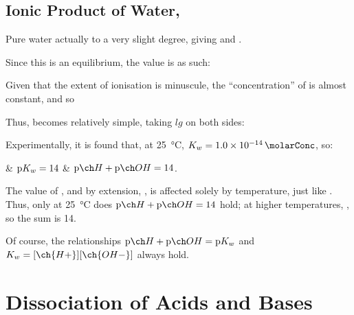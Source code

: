 


		\pagebreak
		\subsection{Ionic Product of Water, \texorpdfstring{\Kw{}}{Kw}}

			Pure water actually  to a very slight degree, giving  and .


			Since this is an equilibrium, the \Kc{} value is as such:

			\mathdiagram{
				\[ \MKc = \frac{[\ch{H+}][\ch{OH-}]}{[\ch{H2O}]} \]
			}

			Given that the extent of ionisation is minuscule, the \enquote{concentration} of  is almost constant, and so

			\mathdiagram{
				\[ \MKw = \MKc \times [\ch{H2O}] = [\ch{H+}][\ch{OH-}] \]
			}

			Thus, \pKw{} becomes relatively simple, taking $lg$ on both sides:

			\mathdiagram{
				$\MpKw = \MpH + \MpOH$
			}

			Experimentally, it is found that, at \SI{25}{\celsius}, $\MKw = \SI{1.0e-14}{\molarConc}$, so:
			\begin{bulletlist}
				& $\mathrm{p}K_{w} = 14$
				& $\MpH + \MpOH = 14$.
			\end{bulletlist}

			The value of \Kw{}, and by extension, \pKw{}, is affected solely by temperature, just like \Kc{}. Thus, only at \SI{25}{\celsius}
			does $\MpH + \MpOH = 14$ hold; at higher temperatures, \Kw{} , so the sum is  \num{14}.

			Of course, the relationships $\MpH + \MpOH = \MpKw$ and $\MKw = [\ch{H+}][\ch{OH-}]$ always hold.




	\pagebreak
	\section{Dissociation of Acids and Bases}

